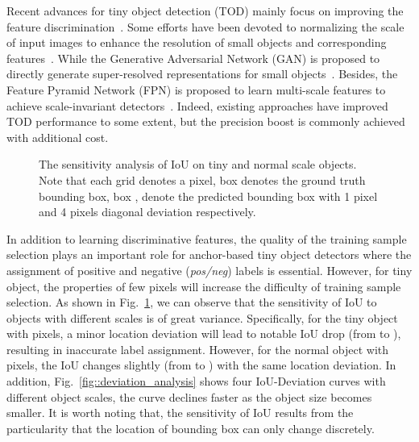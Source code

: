 \documentclass{article}
\newcommand{\fixedvskip}{-3mm}
\begin{document}
Recent advances for tiny object detection (TOD) mainly focus on improving the feature discrimination~\cite{FPN_2017_CVPR,M2Det_2019_AAAI,DetectoRS_2020_arXiv,PGAN_2017_CVPR,SOD-MTGAN_2018_ECCV,Better_to_Follow_2019_ICCV}. 
Some efforts have been devoted to normalizing the scale of input images to enhance the resolution of small objects and corresponding features~\cite{SNIP_2018_CVPR,SNIPER_2018_NIPS}. While the Generative Adversarial Network (GAN) is proposed to directly generate super-resolved representations for small objects~\cite{PGAN_2017_CVPR,SOD-MTGAN_2018_ECCV,Better_to_Follow_2019_ICCV}. 
Besides, the Feature Pyramid Network (FPN) is proposed to learn multi-scale features to achieve scale-invariant detectors~\cite{FPN_2017_CVPR,M2Det_2019_AAAI,DetectoRS_2020_arXiv}. Indeed, existing approaches have improved TOD performance to some extent, but the precision boost is commonly achieved with additional cost.

 \begin{figure}[t]
    \centering
    \vspace{\fixedvskip}
    \label{fig:tiny_analysis}
    \caption{The sensitivity analysis of IoU on tiny and normal scale objects. Note that each grid denotes a pixel, box  denotes the ground truth bounding box, box ,  denote the predicted bounding box with 1 pixel and 4 pixels diagonal deviation respectively.}
    \vspace{\fixedvskip}
\end{figure}

In addition to learning discriminative features, the quality of the training sample selection plays an important role for anchor-based tiny object detectors \cite{atss_2020_cvpr} where the assignment of positive and negative (\textit{pos/neg}) labels is essential. However, for tiny object, the properties of few pixels will increase the difficulty of training sample selection. As shown in Fig.~\ref{fig:tiny_analysis}, we can observe that the sensitivity of IoU to objects with different scales is of great variance. Specifically, for the tiny object with  pixels, a minor location deviation will lead to notable IoU drop (from  to ), resulting in inaccurate label assignment. However, for the normal object with  pixels, the IoU changes slightly (from  to ) with the same location deviation. In addition, Fig.~\ref{fig::deviation_analysis} shows four IoU-Deviation curves with different object scales, the curve declines faster as the object size becomes smaller. It is worth noting that, the sensitivity of IoU results from the particularity that the location of bounding box can only change discretely. 
\end{document}
